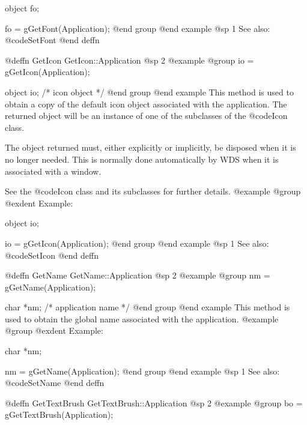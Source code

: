 object  fo;

fo = gGetFont(Application);
@end group
@end example
@sp 1
See also:  @code{SetFont}
@end deffn
















@deffn {GetIcon} GetIcon::Application
@sp 2
@example
@group
io = gGetIcon(Application);

object  io;     /*  icon object  */
@end group
@end example
This method is used to obtain a copy of the default icon object
associated with the application.  The returned object will be an
instance of one of the subclasses of the @code{Icon} class.

The object returned must, either explicitly or implicitly, be
disposed when it is no longer needed.  This is normally done
automatically by WDS when it is associated with a window.

See the @code{Icon} class and its subclasses for further details.
@example
@group
@exdent Example:

object  io;

io = gGetIcon(Application);
@end group
@end example
@sp 1
See also:  @code{SetIcon}
@end deffn















@deffn {GetName} GetName::Application
@sp 2
@example
@group
nm = gGetName(Application);

char    *nm;    /*  application name  */
@end group
@end example
This method is used to obtain the global name associated with the application.
@example
@group
@exdent Example:

char    *nm;

nm = gGetName(Application);
@end group
@end example
@sp 1
See also:  @code{SetName}
@end deffn












@deffn {GetTextBrush} GetTextBrush::Application
@sp 2
@example
@group
bo = gGetTextBrush(Application);

